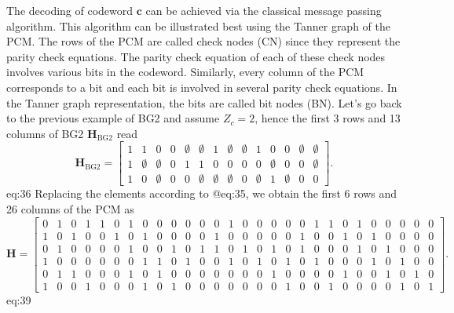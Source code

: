 \documentclass{article}
\def\c{\mathbf{c}}
\def\H{\mathbf{H}}
\def\Hbgt{\mathbf{H}_\mathrm{BG2}}
\def\Zc{{Z_c}}
\begin{document}
The decoding of codeword $\c$ can be achieved via the classical message passing algorithm. This algorithm can be illustrated best using the Tanner graph of the PCM. The rows of the PCM are called check nodes (CN) since they represent the parity check equations. The parity check equation of each of these check nodes involves various bits in the codeword. Similarly, every column of the PCM corresponds to a bit and each bit is involved in several parity check equations. In the Tanner graph representation, the bits are called bit nodes (BN). Let's go back to the previous example of BG2 and assume $\Zc=2$, hence the first 3 rows and 13 columns of BG2 $\Hbgt$ read
\begin{equation*}
  \Hbgt =
  \begin{bmatrix}
    1 & 1         & 0         & 0 & \emptyset & \emptyset & 1         & \emptyset & \emptyset & 1         & 0         & 0         & \emptyset & \emptyset \\
    1 & \emptyset & \emptyset & 0 & 1         & 1         & 0         & 0         & 0         & 0         & \emptyset & 0         & 0         & \emptyset \\
    1 & 0         & \emptyset & 0 & 0         & \emptyset & \emptyset & \emptyset & 0         & \emptyset & 1         & \emptyset & 0         & 0
  \end{bmatrix}.
\end{equation*}{eq:36}
Replacing the elements according to @eq:35, we obtain the first 6 rows and 26 columns of the PCM as
\begin{equation*}
  \H =
  \begin{bmatrix}
    0 & 1 & 0 & 1 & 1 & 0 & 1 & 0 & 0 & 0 & 0 & 0 & 0 & 1 & 0 & 0 & 0 & 0 & 0 & 1 & 1 & 0 & 1 & 0 & 0 & 0 & 0 & 0\\
    1 & 0 & 1 & 0 & 0 & 1 & 0 & 1 & 0 & 0 & 0 & 0 & 1 & 0 & 0 & 0 & 0 & 0 & 1 & 0 & 0 & 1 & 0 & 1 & 0 & 0 & 0 & 0\\
    0 & 1 & 0 & 0 & 0 & 0 & 1 & 0 & 0 & 1 & 0 & 1 & 1 & 0 & 1 & 0 & 1 & 0 & 1 & 0 & 0 & 0 & 1 & 0 & 1 & 0 & 0 & 0\\
    1 & 0 & 0 & 0 & 0 & 0 & 0 & 1 & 1 & 0 & 1 & 0 & 0 & 1 & 0 & 1 & 0 & 1 & 0 & 1 & 0 & 0 & 0 & 1 & 0 & 1 & 0 & 0\\
    0 & 1 & 1 & 0 & 0 & 0 & 1 & 0 & 1 & 0 & 0 & 0 & 0 & 0 & 0 & 0 & 1 & 0 & 0 & 0 & 0 & 1 & 0 & 0 & 1 & 0 & 1 & 0\\
    1 & 0 & 0 & 1 & 0 & 0 & 0 & 1 & 0 & 1 & 0 & 0 & 0 & 0 & 0 & 0 & 0 & 1 & 0 & 0 & 1 & 0 & 0 & 0 & 0 & 1 & 0 & 1
  \end{bmatrix}.
\end{equation*}{eq:39}
\end{document}
